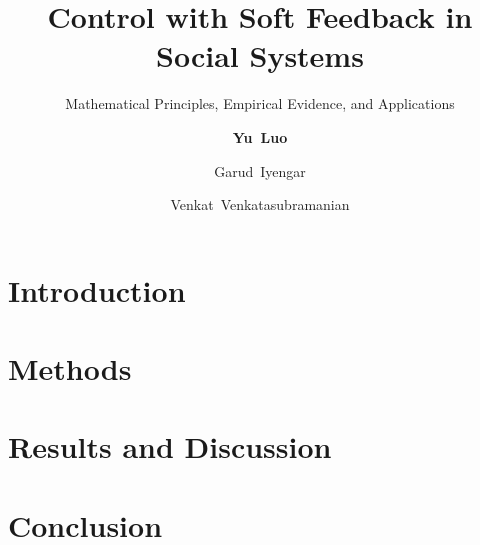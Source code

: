 \documentclass[mathserif
,handout
]{beamer}
\title[AIChE 2017 - Minneapolis, MN] %
{{\bf Control with Soft Feedback in Social Systems}}
\subtitle{\footnotesize Mathematical Principles, Empirical Evidence, and Applications}
\author[Luo, et al.] %
{{\bf Yu~Luo}\inst{1} 
\and Garud~Iyengar\inst{2} \and Venkat~Venkatasubramanian\inst{1}\inst{2}
}
\institute[Columbia University] %
{
  \inst{1}%
  Department of Chemical Engineering%
  \and
  \inst{2}%
  Department of Industrial Engineering and Operations Research%
}
\date[Oct. 29, 2017] %
{AIChE Annual Meeting \rule[-0.4ex]{0.2ex}{1.2em} 
Oct. 29, 2017 \rule[-0.4ex]{0.2ex}{1.2em} 
Minneapolis, MN}
\begin{document}
\frame{\titlepage}


\placelogofalse

\section{Introduction}


\section{Methods}


\section{Results and Discussion}


\section{Conclusion}


\placelogofalse
\appendix

\end{document}
